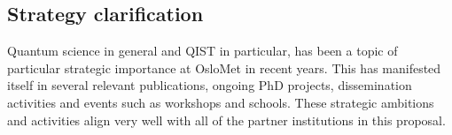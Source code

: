 \documentclass{scrreprt}
\begin{document}
\begin{comment}
\textbf{Key Topics:}
\begin{itemize}
\item Data encoding and quantum feature maps: methods to input classical data into quantum computers (one-hot/basis encoding, amplitude encoding, parameterized feature maps) and how these define a feature space for quantum models.
\item Quantum linear algebra subroutines for ML: quantum algorithms for solving linear systems (the HHL algorithm), eigen-decomposition (quantum principal component analysis), and their relevance to machine learning applications.
\item Quantum-enhanced learning models: quantum support vector machines (using quantum kernel estimation), quantum clustering and nearest-neighbor algorithms, and quantum recommendation system approaches.
\item Quantum neural networks and parametrized quantum circuits: designing quantum circuits with tunable parameters as analogues to neural network models, training these circuits (e.g., via gradient descent or other optimizers), and considerations like barren plateaus in the training landscape.
\item Hybrid quantum-classical algorithms in ML: The \textit{variational quantum eigensolver} (VQE) and \textit{quantum approximate optimizato in algorithm} (QAOA) as examples of using quantum subroutines within classical optimization loops; applications of these hybrid methods to optimization problems and supervised learning tasks.
\item QML software frameworks and tools: introduction to libraries such as TensorFlow Quantum, PennyLane, or Qiskit Machine Learning, which enable the simulation and integration of quantum models into classical machine learning workflows.
\item Emerging applications and case studies: discussion of recent demonstrations and research in QML (e.g., quantum-enhanced data classification in chemistry or finance), and an assessment of what future advances are needed to achieve real-world impact.
\end{itemize}
\end{comment}
\subsection{Strategy clarification}

Quantum science in general and QIST in particular, has been a topic of particular strategic importance at OsloMet in recent years. This has manifested itself in several relevant publications, ongoing PhD projects, dissemination activities and events such as workshops and schools. These strategic ambitions and activities align very well with all of the partner institutions in this proposal.
\end{document}
